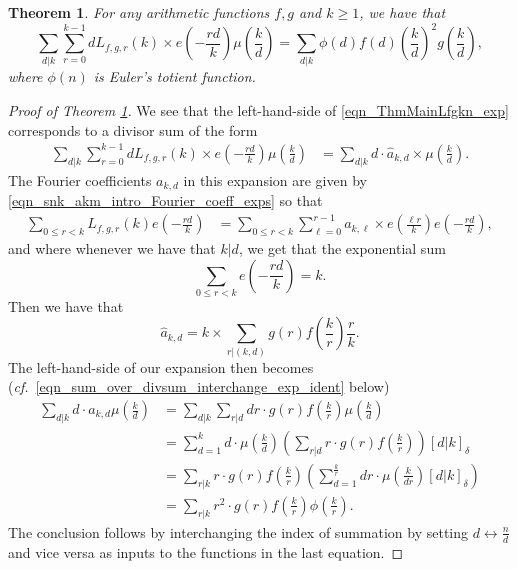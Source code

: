 \documentclass[12pt,reqno,a4letter]{article}
\numberwithin{figure}{section}
\numberwithin{table}{section}
\numberwithin{equation}{section}
\newcommand{\cf}{\textit{cf.~}}
\newcommand{\Iverson}[1]{\ensuremath{\left[#1\right]_{\delta}}}
\newcommand{\e}[1]{e\left(#1\right)}
\theoremstyle{plain}
\newtheorem{theorem}{Theorem}
\numberwithin{theorem}{section}
\theoremstyle{definition}
\begin{document}
\begin{theorem}
\label{theorem_main_lfgmn_exp_v1} 
For any arithmetic functions $f,g$ and $k \geq 1$, we have that 
\begin{equation}
\label{eqn_ThmMainLfgkn_exp}
\sum_{d|k} \sum_{r=0}^{k-1} d L_{f,g,r}(k) \times 
     \e{-\frac{rd}{k}} \mu\left(\frac{k}{d}\right) = 
     \sum_{d|k} \phi(d) f(d) \left(\frac{k}{d}\right)^2 g\left(\frac{k}{d}\right),
\end{equation}  
where $\phi(n)$ is Euler's totient function. 
\end{theorem}
\begin{proof}[Proof of Theorem \ref{theorem_main_lfgmn_exp_v1}] 
We see that the left-hand-side of 
\eqref{eqn_ThmMainLfgkn_exp} corresponds to a divisor sum of the form 
\begin{align*} 
\sum_{d|k} \sum_{r=0}^{k-1} d L_{f,g,r}(k) \times 
     \e{-\frac{rd}{k}} \mu\left(\frac{k}{d}\right) & = 
     \sum_{d|k} d \cdot \hat{a}_{k,d} \times \mu\left(\frac{k}{d}\right). 
\end{align*} 
The Fourier coefficients $a_{k,d}$ in this expansion are given by 
\eqref{eqn_snk_akm_intro_Fourier_coeff_exps} 
\cite[\S 8.3]{APOSTOLANUMT} so that \cite[\S 27.10]{NISTHB} 
\begin{align*}
\sum_{0 \leq r < k} L_{f,g,r}(k) \e{-\frac{rd}{k}} & = 
     \sum_{0 \leq r < k} \sum_{\ell=0}^{r-1} a_{k,\ell} \times 
     \e{\frac{\ell r}{k}} \e{-\frac{rd}{k}}, 
\end{align*} 
and where whenever we have that $k|d$, we get that the exponential sum 
\[
\sum_{0 \leq r < k} \e{-\frac{rd}{k}} = k. 
\]
Then we have that 
\[
\hat{a}_{k,d} = k \times \sum_{r|(k,d)} g(r) f\left(\frac{k}{r}\right) \frac{r}{k}. 
\]
The left-hand-side of our expansion then becomes 
(\cf \eqref{eqn_sum_over_divsum_interchange_exp_ident} below) 
\begin{align*} 
\sum_{d|k} d \cdot a_{k,d} \mu\left(\frac{k}{d}\right) & = 
     \sum_{d|k} \sum_{r|d} dr \cdot g(r) f\left(\frac{k}{r}\right) 
     \mu\left(\frac{k}{d}\right) \\ 
     & = 
     \sum_{d=1}^k d \cdot \mu\left(\frac{k}{d}\right) 
     \left(\sum_{r|d} r \cdot g(r) f\left(\frac{k}{r}\right)\right) \Iverson{d|k} \\ 
     & = 
     \sum_{r|k} r \cdot g(r) f\left(\frac{k}{r}\right) 
     \left(\sum_{d=1}^{\frac{k}{r}} dr \cdot \mu\left(\frac{k}{dr}\right) \Iverson{d|k}\right) \\ 
     & = 
     \sum_{r|k} r^2 \cdot g(r) f\left(\frac{k}{r}\right) 
     \phi\left(\frac{k}{r}\right). 
\end{align*} 
The conclusion follows by interchanging the index of summation by setting 
$d \leftrightarrow \frac{n}{d}$ and vice versa as inputs to the functions 
in the last equation.
\end{proof} 
\end{document}
